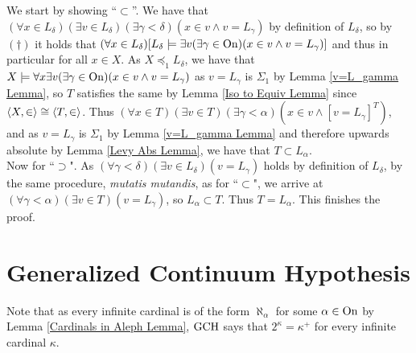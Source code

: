 {We start by showing ``$\subset$''. We have that $(\forall x\in L_\delta)(\exists v\in L_\delta)(\exists\gamma<\delta)(x\in v\land v=L_\gamma)$ by definition of $L_\delta$, so by $(\dagger)$ it holds that $(\forall x\in L_\delta)[L_\delta\models\exists v(\exists\gamma\in\operatorname{On})( x\in v\land v=L_\gamma)]$ and thus in particular for all $x\in X$. As $X\preceq_1L_\delta$, we have that $X\models\forall x\exists v(\exists\gamma\in\operatorname{On})(x\in v\land v=L_\gamma)$ as $v=L_\gamma$ is $\Sigma_1$ by Lemma \ref{v=L_gamma Lemma}, so $T$ satisfies the same by Lemma \ref{Iso to Equiv Lemma} since $\langle X,\in\rangle\cong\langle T,\in\rangle$. Thus $(\forall x\in T)(\exists v\in T)(\exists\gamma<\alpha)(x\in v\land[v=L_\gamma]^T)$, and as $v=L_\gamma$ is $\Sigma_1$ by Lemma \ref{v=L_gamma Lemma} and therefore upwards absolute by Lemma \ref{Levy Abs Lemma}, we have that $T\subset L_\alpha$.\\

Now for ``$\supset$". As $(\forall\gamma<\delta)(\exists v\in L_\delta)(v=L_\gamma)$ holds by definition of $L_\delta$, by the same procedure, \textit{mutatis mutandis}, as for ``$\subset$", we arrive at $(\forall\gamma<\alpha)(\exists v\in T)(v=L_\gamma)$, so $L_\alpha\subset T$. Thus $T=L_\alpha$. This finishes the proof.
}

\section{Generalized Continuum Hypothesis}

Note that as every infinite cardinal is of the form $\aleph_\alpha$ for some $\alpha\in\operatorname{On}$ by Lemma \ref{Cardinals in Aleph Lemma}, $\operatorname{GCH}$ says that $2^\kappa=\kappa^+$ for every infinite cardinal $\kappa$.\\

